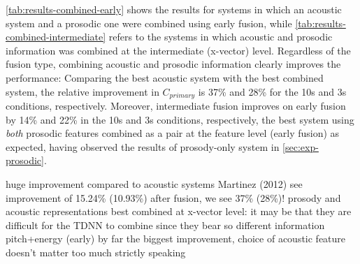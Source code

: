 \documentclass[bsc,frontabs,twoside,singlespacing,parskip,deptreport]{infthesis}
\begin{document}
{{    \autoref{tab:results-combined-early} shows the results for systems in which an acoustic system and a prosodic one were combined using early fusion, while \autoref{tab:results-combined-intermediate} refers to the systems in which acoustic and prosodic information was combined at the intermediate (x-vector) level. Regardless of the fusion type, combining acoustic and prosodic information clearly improves the performance: Comparing the best acoustic system with the best combined system, the relative improvement in $C_{primary}$ is 37\% and 28\% for the 10s and 3s conditions, respectively. Moreover, intermediate fusion improves on early fusion by 14\% and 22\% in the 10s and 3s conditions, respectively, the best system using \textit{both} prosodic features combined as a pair at the feature level (early fusion) as expected, having observed the results of prosody-only system in \autoref{sec:exp-prosodic}.


    huge improvement compared to acoustic systems
    Martinez (2012) see improvement of 15.24\% (10.93\%) after fusion, we see 37\% (28\%)!
    prosody and acoustic representations best combined at x-vector level: it may be that they are difficult for the TDNN to combine since they bear so different information
    pitch+energy (early) by far the biggest improvement, choice of acoustic feature doesn't matter too much strictly speaking
  }
}
\end{document}
